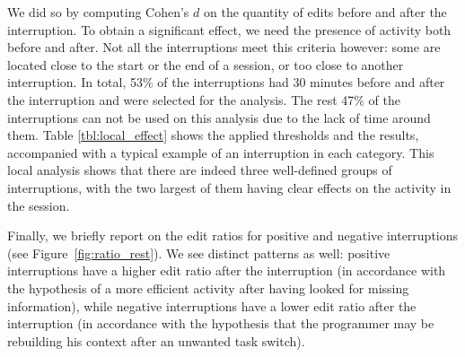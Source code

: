 \documentclass[times]{smrauth}
\begin{document}
We did so by computing Cohen's $d$ on the quantity of edits before and after the interruption. To obtain a significant effect, we need the presence of activity both before and after. Not all the interruptions meet this criteria however: some are located close to the start or the end of a session, or too close to another interruption.  In total, 53\% of the interruptions had 30 minutes before and after the interruption and were selected for the analysis. The rest 47\% of the interruptions can not be used on this analysis due to the lack of time around them. %
Table \ref{tbl:local_effect} shows the applied thresholds and the results, accompanied with a typical example of an interruption in each category. This local analysis shows that there are indeed three well-defined groups of interruptions, with the two largest of them having clear effects on the activity in the session.

Finally, we briefly report on the edit ratios for positive and negative interruptions (see Figure~\ref{fig:ratio_rest}). We see distinct patterns as well: positive interruptions have a higher edit ratio after the interruption (in accordance with the hypothesis of a more efficient activity after having looked for missing information), while negative interruptions have a lower edit ratio after the interruption (in accordance with the hypothesis that the programmer may be rebuilding his context after an unwanted task switch).

\end{document}

